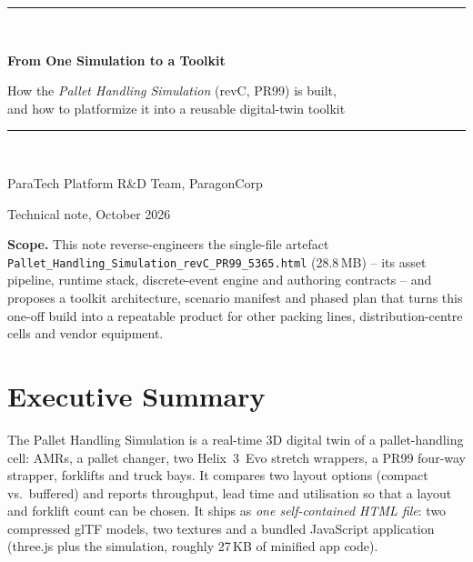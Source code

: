 \documentclass[11pt,a4paper]{article}
\begin{document}
\begin{titlepage}
\centering\vspace*{3cm}
{\color{pxblue}\rule{\linewidth}{1.2pt}}\\[6mm]
{\Huge\bfseries From One Simulation to a Toolkit\par}
\vspace{4mm}
{\Large How the \emph{Pallet Handling Simulation} (revC, PR99) is built,\\and how to platformize it into a reusable digital-twin toolkit\par}
\vspace{4mm}
{\color{pxblue}\rule{\linewidth}{1.2pt}}\\[2cm]
{\large ParaTech Platform R\&D Team, ParagonCorp\par}
\vspace{2mm}
{\normalsize Technical note, October 2026\par}
\vspace{2cm}
\begin{minipage}{0.85\linewidth}
\small\textbf{Scope.} This note reverse-engineers the single-file artefact
\texttt{Pallet\_Handling\_Simulation\_revC\_PR99\_5365.html} (28.8\,MB) --
its asset pipeline, runtime stack, discrete-event engine and authoring
contracts -- and proposes a toolkit architecture, scenario manifest and
phased plan that turns this one-off build into a repeatable product for
other packing lines, distribution-centre cells and vendor equipment.
\end{minipage}
\vfill
\end{titlepage}

\tableofcontents
\newpage

\section{Executive Summary}
The Pallet Handling Simulation is a real-time 3D digital twin of a pallet-handling
cell: AMRs, a pallet changer, two Helix~3~Evo stretch wrappers, a PR99 four-way strapper,
forklifts and truck bays. It compares two layout options (compact vs.\ buffered) and reports
throughput, lead time and utilisation so that a layout and forklift count can be chosen.
It ships as \emph{one self-contained HTML file}: two compressed glTF models, two textures and a
bundled JavaScript application (three.js plus the simulation, roughly 27\,KB of minified app code).
\end{document}

